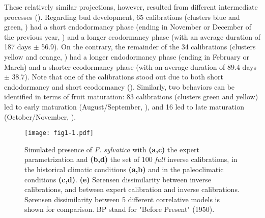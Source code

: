\documentclass[letterpaper,8pt]{extarticle}  %
\begin{document}
\begin{doublespacing}
\begin{linenumbers}
These relatively similar projections, however, resulted from different intermediate processes (). Regarding bud development, 65 calibrations (clusters blue and green, )  had a short endodormancy phase (ending in November or December of the previous year, ) and a longer ecodormancy phase (with an average duration of 187 days $\pm$ 56.9). On the contrary, the remainder of the 34 calibrations (clusters yellow and orange, ) had a longer endodormancy phase (ending in February or March) and a shorter ecodormancy phase (with an average duration of 89.4 days $\pm$ 38.7). Note that one of the calibrations stood out due to both short endodormancy and short ecodormancy (). Similarly, two behaviors can be identified in terms of fruit maturation: 83 calibrations (clusters green and yellow) led to early maturation (August/September, ), and 16 led to late maturation (October/November, ).



\begin{figure}[htpb]
\centering
\begin{subcaptiongroup}
\label{fig:1A} 
\label{fig:1B}
\label{fig:1C}
\label{fig:1D}
\label{fig:1E}
\end{subcaptiongroup}
\texttt{[image: fig1-1.pdf]}
\caption{Simulated presence of \emph{F. sylvatica} with \textbf{(a,c)} the expert parametrization and \textbf{(b,d)} the set of 100 \emph{full} inverse calibrations, in the historical climatic conditions \textbf{(a,b)} and in the paleoclimatic conditions \textbf{(c,d)}. \textbf{(e)} S\o rensen dissimilarity between inverse calibrations, and between expert calibration and inverse calibrations. S\o rensen dissimilarity between 5 different correlative models is shown for comparison. BP stand for "Before Present" (1950).}
\label{fig:1}
\end{figure}



\end{linenumbers}
\end{doublespacing}
\end{document}
